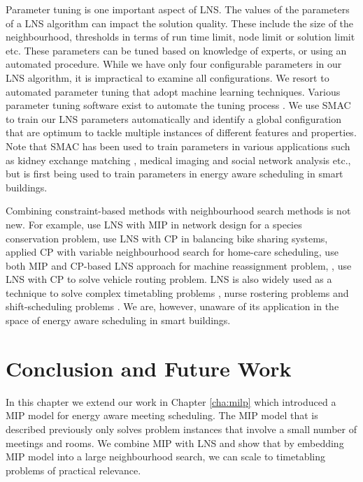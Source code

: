 Parameter tuning is one important aspect of LNS. The values of the parameters of a LNS algorithm can impact the solution quality. These include the size of the neighbourhood, thresholds in terms of run time limit, node limit or solution limit etc. These parameters can be tuned based on knowledge of experts, or using an automated procedure. While we have only four configurable parameters in our LNS algorithm, it is impractical to examine all configurations. We resort to automated parameter tuning that adopt machine learning techniques.  Various parameter tuning software exist to automate the tuning process \citep{thornton2013auto,bergstra2012random, hutter2011sequential}. We use SMAC \citep{hutter2011sequential} to train our LNS parameters automatically and identify a global configuration that are optimum to tackle multiple instances of different features and properties. 
Note that SMAC has been used to train parameters in various applications such as kidney exchange matching \citep{dickerson2015futurematch}, medical imaging \citep{angermueller2016deep} and social network analysis \citep{vaswani2016adaptive} etc., but is first being used to train parameters in energy aware scheduling in smart buildings.

Combining constraint-based methods with neighbourhood search methods is not new. For example, \cite{lebras2013robust} use LNS with MIP in network design for a species conservation problem, \cite{gaspero2013constraint} use LNS with CP in balancing bike sharing systems, applied CP with variable neighbourhood search for home-care scheduling, \cite{mehta2012comparing} use both MIP and CP-based LNS approach for machine reassignment problem, \cite{bent2004two}, \cite{kilby2011flexible} use LNS with CP to solve vehicle routing problem. LNS is also widely used as a technique to solve complex timetabling problems \citep{meyers2006very,abdullah2007investigating,burke2010hybrid}, nurse rostering problems \citep{bilgin2012local} and shift-scheduling problems \citep{quimper2010large}. We are, however, unaware of its application in the space of energy aware scheduling in smart buildings.



\section{Conclusion and Future Work}\label{sec:lns:conclusion}

In this chapter we extend our work in Chapter \ref{cha:milp} which introduced a MIP model for energy aware meeting scheduling. The MIP model that is described previously only solves problem instances that involve a small number of meetings and rooms. We combine MIP with LNS %
and show that by embedding MIP model into a large neighbourhood search, we can scale to timetabling problems of practical relevance.

